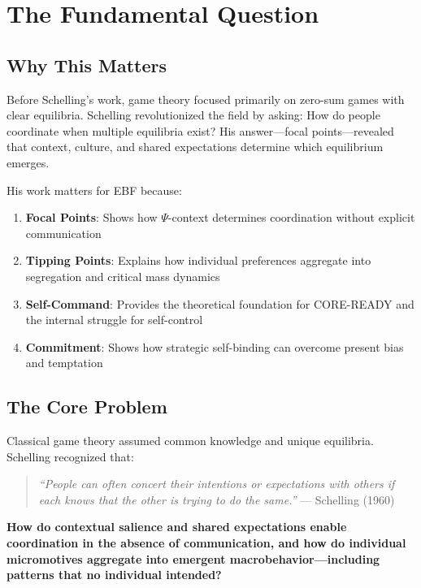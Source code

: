 \section{The Fundamental Question}
\label{sec:ts-fundamental}

\subsection{Why This Matters}

Before Schelling's work, game theory focused primarily on zero-sum games with
clear equilibria. Schelling revolutionized the field by asking: How do people
coordinate when multiple equilibria exist? His answer---focal points---revealed
that context, culture, and shared expectations determine which equilibrium emerges.

His work matters for EBF because:
\begin{enumerate}
\item \textbf{Focal Points}: Shows how $\Psi$-context determines coordination
      without explicit communication
\item \textbf{Tipping Points}: Explains how individual preferences aggregate into
      segregation and critical mass dynamics
\item \textbf{Self-Command}: Provides the theoretical foundation for CORE-READY
      and the internal struggle for self-control
\item \textbf{Commitment}: Shows how strategic self-binding can overcome
      present bias and temptation
\end{enumerate}

\subsection{The Core Problem}

Classical game theory assumed common knowledge and unique equilibria. Schelling
recognized that:

\begin{quote}
\textit{``People can often concert their intentions or expectations with others
if each knows that the other is trying to do the same.''}
--- Schelling (1960)
\end{quote}

\begin{tcolorbox}[colback=red!5!white, colframe=red!75!black,
    title=The Fundamental Question]
\textbf{How do contextual salience and shared expectations enable coordination
in the absence of communication, and how do individual micromotives aggregate
into emergent macrobehavior---including patterns that no individual intended?}
\end{tcolorbox}


